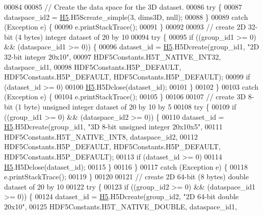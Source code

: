 \begin{DoxyCode}
00084 
00085         \textcolor{comment}{// Create the data space for the  3D dataset.}
00086         \textcolor{keywordflow}{try} \{
00087             dataspace\_id2 = \hyperlink{namespace_h5}{H5}.H5Screate\_simple(3, dims3D, null);
00088         \}
00089         \textcolor{keywordflow}{catch} (Exception e) \{
00090             e.printStackTrace();
00091         \}
00092 
00093         \textcolor{comment}{// create 2D 32-bit (4 bytes) integer dataset of 20 by 10}
00094         \textcolor{keywordflow}{try} \{
00095             \textcolor{keywordflow}{if} ((group\_id1 >= 0) && (dataspace\_id1 >= 0)) \{
00096                 dataset\_id = \hyperlink{namespace_h5}{H5}.H5Dcreate(group\_id1, \textcolor{stringliteral}{"2D 32-bit integer 20x10"},
00097                         HDF5Constants.H5T\_NATIVE\_INT32, dataspace\_id1,
00098                         HDF5Constants.H5P\_DEFAULT, HDF5Constants.H5P\_DEFAULT, HDF5Constants.H5P\_DEFAULT);
00099                 \textcolor{keywordflow}{if} (dataset\_id >= 0)
00100                     \hyperlink{namespace_h5}{H5}.H5Dclose(dataset\_id);
00101             \}
00102         \}
00103         \textcolor{keywordflow}{catch} (Exception e) \{
00104             e.printStackTrace();
00105         \}
00106 
00107         \textcolor{comment}{// create 3D 8-bit (1 byte) unsigned integer dataset of 20 by 10 by 5}
00108         \textcolor{keywordflow}{try} \{
00109             \textcolor{keywordflow}{if} ((group\_id1 >= 0) && (dataspace\_id2 >= 0)) \{
00110                 dataset\_id = \hyperlink{namespace_h5}{H5}.H5Dcreate(group\_id1, \textcolor{stringliteral}{"3D 8-bit unsigned integer 20x10x5"},
00111                         HDF5Constants.H5T\_NATIVE\_INT8, dataspace\_id2,
00112                         HDF5Constants.H5P\_DEFAULT, HDF5Constants.H5P\_DEFAULT, HDF5Constants.H5P\_DEFAULT);
00113                 \textcolor{keywordflow}{if} (dataset\_id >= 0)
00114                     \hyperlink{namespace_h5}{H5}.H5Dclose(dataset\_id);
00115             \}
00116         \}
00117         \textcolor{keywordflow}{catch} (Exception e) \{
00118             e.printStackTrace();
00119         \}
00120 
00121         \textcolor{comment}{// create 2D 64-bit (8 bytes) double dataset of 20 by 10}
00122         \textcolor{keywordflow}{try} \{
00123             \textcolor{keywordflow}{if} ((group\_id2 >= 0) && (dataspace\_id1 >= 0)) \{
00124                 dataset\_id = \hyperlink{namespace_h5}{H5}.H5Dcreate(group\_id2, \textcolor{stringliteral}{"2D 64-bit double 20x10"},
00125                         HDF5Constants.H5T\_NATIVE\_DOUBLE, dataspace\_id1,

\end{DoxyCode}
